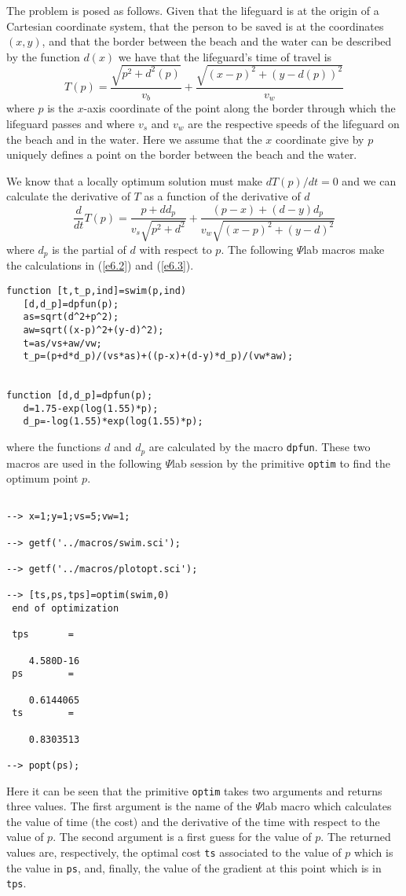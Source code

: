 	The problem is posed as follows.  Given that the lifeguard 
is at the origin of a Cartesian coordinate system, that the person
to be saved is at the coordinates $(x,y)$, and that the border
between the beach and the water can be described by the function
$d(x)$ we have that the lifeguard's time of travel is
\begin{equation}
T(p)=\frac{\sqrt{p^2+d^2(p)}}{v_b}+\frac{\sqrt{(x-p)^2+(y-d(p))^2}}{v_w}
\label{e6.2}
\end{equation}
where $p$ is the $x$-axis coordinate of the point along the border through
which the lifeguard passes and
where $v_s$ and $v_w$ are the respective 
speeds of the lifeguard on the beach and in the water.
Here we assume that the $x$ coordinate give by $p$ uniquely defines
a point on the border between the beach and the water.

	We know that a locally optimum solution must make 
$dT(p)/dt=0$ and we can calculate the derivative of $T$ as
a function of the derivative of $d$
\begin{equation}
\frac{d}{dt}T(p)=\frac{p+dd_p}{v_s\sqrt{p^2+d^2}}
                 +\frac{(p-x)+(d-y)d_p}{v_w\sqrt{(x-p)^2+(y-d)^2}}
\label{e6.3}
\end{equation}
where $d_p$ is the partial of $d$ with respect to $p$.  The following
$\Psi$lab macros make the calculations in (\ref{e6.2}) and (\ref{e6.3}).
\begin{verbatim}
function [t,t_p,ind]=swim(p,ind)
   [d,d_p]=dpfun(p);
   as=sqrt(d^2+p^2);
   aw=sqrt((x-p)^2+(y-d)^2);
   t=as/vs+aw/vw;
   t_p=(p+d*d_p)/(vs*as)+((p-x)+(d-y)*d_p)/(vw*aw);


function [d,d_p]=dpfun(p);
   d=1.75-exp(log(1.55)*p);
   d_p=-log(1.55)*exp(log(1.55)*p);
\end{verbatim}
where the functions $d$ and $d_p$ are calculated by the macro {\tt dpfun}.
These two macros are used in the following $\Psi$lab session by the
primitive {\tt optim} to find the optimum point $p$.
\begin{verbatim}
 
--> x=1;y=1;vs=5;vw=1;
 
--> getf('../macros/swim.sci');
 
--> getf('../macros/plotopt.sci');
 
--> [ts,ps,tps]=optim(swim,0)
 end of optimization
 
 tps       =
 
    4.580D-16  
 ps        =
 
    0.6144065  
 ts        =
 
    0.8303513  
 
--> popt(ps);
\end{verbatim}
Here it can be seen that the primitive {\tt optim} takes two 
arguments and returns three values.  The first argument is the
name of the $\Psi$lab macro which calculates the value of time (the cost)
and the derivative of the time with respect to the value of $p$.
The second argument is a first guess for the value of $p$.
The returned values are, respectively, the optimal cost {\tt ts}
associated to the value of $p$ which is the value in {\tt ps}, and,
finally, the value of the gradient at this point which is in
{\tt tps}.

